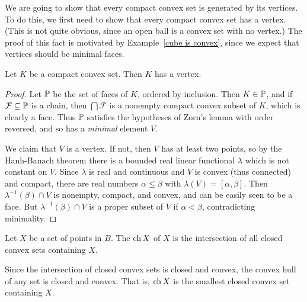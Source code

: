 \begin{subsec}
We are going to show that every compact convex set is generated by its vertices.
To do this, we first need to show that every compact convex set has a vertex.
(This is not quite obvious, since an open ball is a convex set with no vertex.)
The proof of this fact is motivated by Example~\ref{cube is convex}, since we expect that vertices should be minimal faces.
\end{subsec}

\begin{lemma}\label{vertices exist}
Let $K$ be a compact convex set. Then $K$ has a vertex.
\end{lemma}
\begin{proof}
Let $\mathbb{P}$ be the set of faces of $K$, ordered by inclusion.
Then $K \in \mathbb{P}$, and if $\mathcal F \subseteq \mathbb{P}$ is a chain, then $\bigcap \mathcal F$ is a nonempty compact convex subset of $K$, which is clearly a face.
Thus $\mathbb{P}$ satisfies the hypotheses of Zorn's lemma with order reversed, and so has a \emph{minimal} element $V$.

We claim that $V$ is a vertex. If not, then $V$ has at least two points, so by the Hanh-Banach theorem there is a bounded real linear functional $\lambda$ which is not constant on $V$.
Since $\lambda$ is real and continuous and $V$ is convex (thus connected) and compact, there are real numbers $\alpha \leq \beta$ with $\lambda(V) = [\alpha, \beta]$.
Then $\lambda^{-1}(\beta) \cap V$ is nonempty, compact, and convex, and can be easily seen to be a face.
But $\lambda^{-1}(\beta) \cap V$ is a proper subset of $V$ if $\alpha < \beta$, contradicting minimality.
\end{proof}

\begin{definition}
Let $X$ be a set of points in $B$. The  $\operatorname{ch} X$ of $X$ is the intersection of all closed convex sets containing $X$.
\end{definition}

\begin{subsec}
Since the intersection of closed convex sets is closed and convex, the convex hull of any set is closed and convex.
That is, $\operatorname{ch} X$ is the smallest closed convex set containing $X$.
\end{subsec}

